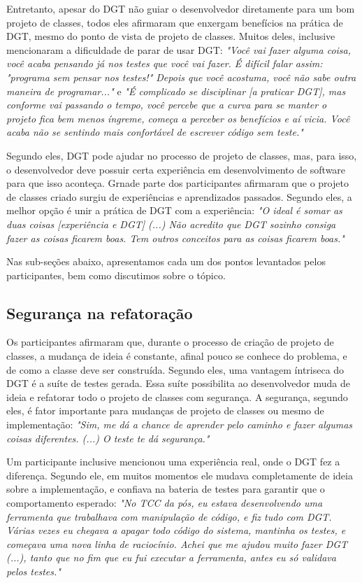 Entretanto, apesar do DGT não guiar o desenvolvedor diretamente para um bom projeto de classes,
todos eles afirmaram que enxergam benefícios na prática de DGT, mesmo do
ponto de vista de projeto de classes. Muitos deles, inclusive mencionaram a dificuldade
de parar de usar DGT:
\textit{"Você vai fazer alguma coisa, você acaba pensando já nos testes que você vai fazer. É difícil 
falar assim: "programa sem pensar nos testes!" Depois que você acostuma, você não sabe outra
maneira de programar..."} e \textit{"É complicado se disciplinar [a praticar DGT], mas conforme vai passando o tempo, 
você percebe que a curva para se manter o projeto fica bem menos íngreme, 
começa a perceber os benefícios e aí vicia. Você acaba não se sentindo
mais confortável de escrever código sem teste."}

Segundo eles, DGT pode ajudar no processo de projeto de classes, mas, para isso,
o desenvolvedor deve possuir certa experiência em desenvolvimento de software
para que isso aconteça. Grnade parte dos participantes afirmaram que o 
projeto de classes criado surgiu de experiências e aprendizados passados.
Segundo eles, a melhor opção é unir a prática de DGT com a experiência:
\textit{"O ideal é somar as duas coisas [experiência e DGT] (...) 
Não acredito que DGT sozinho consiga fazer as coisas ficarem boas. Tem outros conceitos
para as coisas ficarem boas."}

Nas sub-seções abaixo, apresentamos cada um dos pontos 
levantados pelos participantes, bem como discutimos sobre o tópico.

\subsection{Segurança na refatoração}

Os participantes afirmaram que, durante o processo de criação de projeto de classes, a mudança de ideia é
constante, afinal pouco se conhece do problema, e de como a classe deve ser construída. Segundo eles,
uma vantagem íntriseca do DGT é a suíte de testes gerada. Essa suíte possibilita ao desenvolvedor
muda de ideia e refatorar todo o projeto de classes com segurança.
A segurança, segundo eles, é fator importante para mudanças de projeto de classes ou mesmo de implementação:
\textit{"Sim, me dá a chance de aprender pelo caminho e fazer algumas coisas diferentes. (...) O teste te dá segurança."}

Um participante inclusive mencionou uma experiência real, onde o DGT fez a diferença. Segundo ele,
em muitos momentos ele mudava completamente de ideia sobre a implementação, e confiava na bateria
de testes para garantir que o comportamento esperado:
\textit{"No TCC da pós, eu estava desenvolvendo uma ferramenta que trabalhava com manipulação de código, e fiz
tudo com DGT. Várias vezes eu chegava a apagar todo código do sistema, mantinha os testes, e começava uma nova
linha de raciocínio. Achei que me ajudou muito fazer DGT (...), tanto que no fim que eu fui executar a ferramenta,
antes eu só validava pelos testes."}

